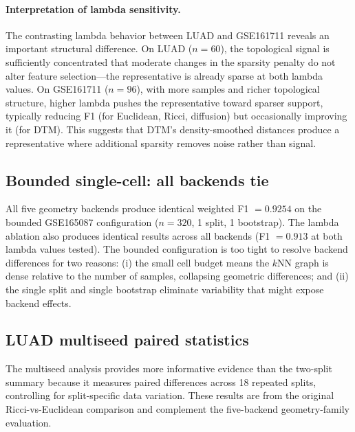 \documentclass[11pt]{article}
\begin{document}
\paragraph{Interpretation of lambda sensitivity.}
The contrasting lambda behavior between LUAD and GSE161711 reveals an important structural difference.
On LUAD ($n = 60$), the topological signal is sufficiently concentrated that moderate changes in the sparsity penalty do not alter feature selection---the representative is already sparse at both lambda values.
On GSE161711 ($n = 96$), with more samples and richer topological structure, higher lambda pushes the representative toward sparser support, typically reducing F1 (for Euclidean, Ricci, diffusion) but occasionally improving it (for DTM).
This suggests that DTM's density-smoothed distances produce a representative where additional sparsity removes noise rather than signal.

\subsection{Bounded single-cell: all backends tie}

All five geometry backends produce identical weighted F1 $= 0.9254$ on the bounded GSE165087 configuration ($n = 320$, 1 split, 1 bootstrap).
The lambda ablation also produces identical results across all backends (F1 $= 0.913$ at both lambda values tested).
The bounded configuration is too tight to resolve backend differences for two reasons: (i) the small cell budget means the $k$NN graph is dense relative to the number of samples, collapsing geometric differences; and (ii) the single split and single bootstrap eliminate variability that might expose backend effects.

\subsection{LUAD multiseed paired statistics}

The multiseed analysis provides more informative evidence than the two-split summary because it measures paired differences across 18 repeated splits, controlling for split-specific data variation.
These results are from the original Ricci-vs-Euclidean comparison and complement the five-backend geometry-family evaluation.
\end{document}
